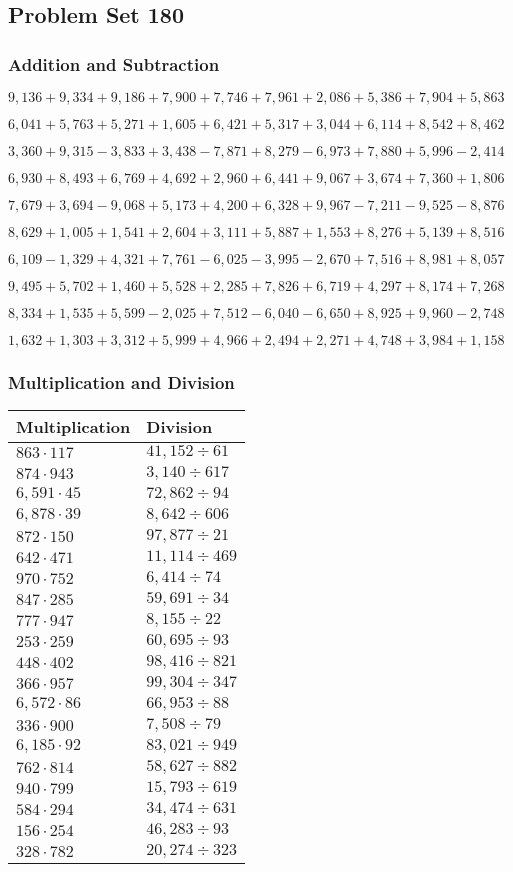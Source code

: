\hypertarget{problem-set-180}{%
\subsection{Problem Set 180}\label{problem-set-180}}

\hypertarget{addition-and-subtraction}{%
\subsubsection{Addition and
Subtraction}\label{addition-and-subtraction}}

\(9,136+9,334+9,186+7,900+7,746+7,961+2,086+5,386+7,904+5,863\)

\(6,041+5,763+5,271+1,605+6,421+5,317+3,044+6,114+8,542+8,462\)

\(3,360+9,315-3,833+3,438-7,871+8,279-6,973+7,880+5,996-2,414\)

\(6,930+8,493+6,769+4,692+2,960+6,441+9,067+3,674+7,360+1,806\)

\(7,679+3,694-9,068+5,173+4,200+6,328+9,967-7,211-9,525-8,876\)

\(8,629+1,005+1,541+2,604+3,111+5,887+1,553+8,276+5,139+8,516\)

\(6,109-1,329+4,321+7,761-6,025-3,995-2,670+7,516+8,981+8,057\)

\(9,495+5,702+1,460+5,528+2,285+7,826+6,719+4,297+8,174+7,268\)

\(8,334+1,535+5,599-2,025+7,512-6,040-6,650+8,925+9,960-2,748\)

\(1,632+1,303+3,312+5,999+4,966+2,494+2,271+4,748+3,984+1,158\)

\hypertarget{multiplication-and-division}{%
\subsubsection{Multiplication and
Division}\label{multiplication-and-division}}

\begin{longtable}[]{@{}ll@{}}
\toprule
Multiplication & Division\tabularnewline
\midrule
\endhead
\(863\cdot117\) & \(41,152÷61\)\tabularnewline
\(874\cdot943\) & \(3,140÷617\)\tabularnewline
\(6,591\cdot45\) & \(72,862÷94\)\tabularnewline
\(6,878\cdot39\) & \(8,642÷606\)\tabularnewline
\(872\cdot150\) & \(97,877÷21\)\tabularnewline
\(642\cdot471\) & \(11,114÷469\)\tabularnewline
\(970\cdot752\) & \(6,414÷74\)\tabularnewline
\(847\cdot285\) & \(59,691÷34\)\tabularnewline
\(777\cdot947\) & \(8,155÷22\)\tabularnewline
\(253\cdot259\) & \(60,695÷93\)\tabularnewline
\(448\cdot402\) & \(98,416÷821\)\tabularnewline
\(366\cdot957\) & \(99,304÷347\)\tabularnewline
\(6,572\cdot86\) & \(66,953÷88\)\tabularnewline
\(336\cdot900\) & \(7,508÷79\)\tabularnewline
\(6,185\cdot92\) & \(83,021÷949\)\tabularnewline
\(762\cdot814\) & \(58,627÷882\)\tabularnewline
\(940\cdot799\) & \(15,793÷619\)\tabularnewline
\(584\cdot294\) & \(34,474÷631\)\tabularnewline
\(156\cdot254\) & \(46,283÷93\)\tabularnewline
\(328\cdot782\) & \(20,274÷323\)\tabularnewline
\bottomrule
\end{longtable}
